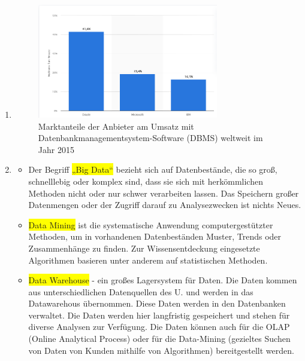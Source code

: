 \begin{enumerate}
    \item \color{brown}{Welche DBMS sind zur Zeit auf dem Markt präsent und wie sind die Marktanteile verteilt (Internet nutzen)?}
    \begin{itemize}
        \begin{center}
            \begin{figure}[H]
                \centering
                \includegraphics[height=5cm]{imgs/subjects_media/lf8/dmbs_marketanteil}
                \caption{\footnotesize Marktanteile der Anbieter am Umsatz mit Datenbankmanagementsystem-Software (DBMS) weltweit im Jahr 2015 }\label{fig:DBMS Marktanteile}
            \end{figure}
        \end{center}
    \end{itemize}
    \item \color{brown}{Was versteht man unter "Big Data", "Data Mining" und "Data Warehouse"?}
    \begin{itemize}\color{black}
        \item Der Begriff \colorbox{yellow}{„Big Data“} bezieht sich auf Datenbestände, die so groß, schnelllebig oder komplex sind, dass sie sich mit herkömmlichen Methoden nicht oder nur schwer verarbeiten lassen.
        Das Speichern großer Datenmengen oder der Zugriff darauf zu Analysezwecken ist nichts Neues.
        \item \colorbox{yellow}{Data Mining} ist die systematische Anwendung computergestützter Methoden, um in vorhandenen Datenbeständen Muster, Trends oder Zusammenhänge zu finden.
        Zur Wissensentdeckung eingesetzte Algorithmen basieren unter anderem auf statistischen Methoden.
        \item \colorbox{yellow} {Data Warehouse} - ein großes Lagersystem für Daten.
        Die Daten kommen aus unterschiedlichen Datenquellen des U. und werden in das Datawarehous übernommen.
        Diese Daten werden in den Datenbanken verwaltet.
        Die Daten werden hier langfristig gespeichert und stehen für diverse Analysen zur Verfügung.
        Die Daten können auch für die OLAP (Online Analytical Process) oder für die Data-Mining (gezieltes Suchen von Daten von Kunden mithilfe von Algorithmen) bereitgestellt werden.
    \end{itemize}
\end{enumerate}
\setcounter{section}{0}
\setcounter{figure}{0}